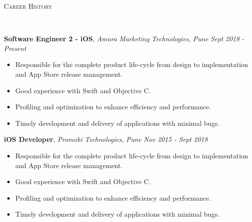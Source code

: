 \documentclass[9pt]{article}
\newenvironment{changemargin}[2]{%
  \begin{list}{}{%
    \setlength{\topsep}{0pt}%
    \setlength{\leftmargin}{#1}%
    \setlength{\rightmargin}{#2}%
    \setlength{\listparindent}{\parindent}%
    \setlength{\itemindent}{\parindent}%
    \setlength{\parsep}{\parskip}%
  }%
  \item[]}{\end{list}
}
\newcommand{\lineover}{
    \begin{changemargin}{-0.05in}{-0.05in}
        \vspace*{-8pt}
        \hrulefill \\
        \vspace*{-2pt}
    \end{changemargin}
}
\newcommand{\header}[1]{
    \begin{changemargin}{-0.5in}{-0.5in}
        \scshape{#1}\\
    \lineover
    \end{changemargin}
}
\newenvironment{body} {
    \vspace*{-16pt}
    \begin{changemargin}{-0.25in}{-0.5in}
  }
    {\end{changemargin}
}
\begin{document}
\header{Career History}

\begin{body}
    \vspace{14pt}
    \textbf{Software Engineer 2 - iOS}, \emph{Amura Marketing Technologies, Pune} \hfill \emph{Sept 2018 - Present}\\
    \begin{itemize} \itemsep -0pt  %
        \item Responsible for the complete product life-cycle from design to implementation and App Store release management.
    \end{itemize}
    \begin{itemize} \itemsep -0pt  %
        \item Good experience with Swift and Objective C.
    \end{itemize}
    \begin{itemize} \itemsep -0pt  %
        \item Profiling and optimization to enhance efficiency and performance.
    \end{itemize}
    \begin{itemize} \itemsep -0pt  %
        \item Timely development and delivery of applications with minimal bugs.
    \end{itemize}
    \vspace*{-4pt}

    \vspace{14pt}
    \textbf{iOS Developer}, \emph{Promobi Technologies, Pune} \hfill \emph{Nov 2015 - Sept 2018}\\
    \begin{itemize} \itemsep -0pt  %
        \item Responsible for the complete product life-cycle from design to implementation and App Store release management.
    \end{itemize}
    \begin{itemize} \itemsep -0pt  %
        \item Good experience with Swift and Objective C.
    \end{itemize}
    \begin{itemize} \itemsep -0pt  %
        \item Profiling and optimization to enhance efficiency and performance.
    \end{itemize}
    \begin{itemize} \itemsep -0pt  %
        \item Timely development and delivery of applications with minimal bugs.
    \end{itemize}
    \vspace*{-4pt}


\end{body}
\end{document}
